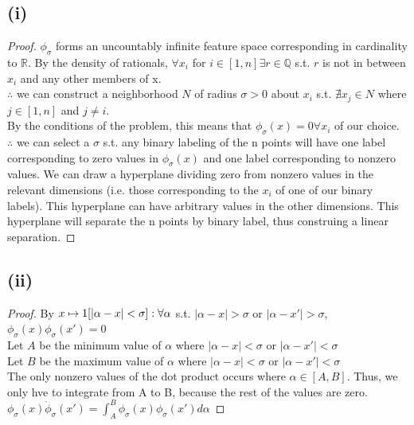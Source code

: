 \documentclass[twoside,11pt]{homework}
\begin{document}
 \subsection*{(i)}
 	\begin{proof}
 		$\phi_\sigma$ forms an uncountably infinite feature space corresponding in cardinality to $\mathbb{R}$.
 		By the density of rationals, $\forall x_i$ for $i \in [1,n] \exists r \in \mathbb{Q}$
 		s.t. $r$ is not in between $x_i$ and any other members of x. \\
 		$\therefore$ we can construct a neighborhood $N$ of radius $\sigma > 0$ about $x_i$
 		s.t. $\nexists x_j \in N$ where $j \in [1, n]$ and $j \neq i$. \\
 		By the conditions of the problem, this means that $\phi_\sigma (x) = 0 \forall x_i$ of our choice. \\
 		$\therefore$ we can select a $\sigma$ s.t. any binary labeling of the n points will have one label corresponding to zero values in $\phi_\sigma(x)$ and one label corresponding to nonzero values. We can draw a hyperplane dividing zero from nonzero values in the relevant dimensions (i.e. those corresponding to the $x_i$ of one of our binary labels). This hyperplane can have arbitrary values in the other dimensions. This hyperplane will separate the n points by binary label, thus construing a linear separation.
 	\end{proof}

 \subsection*{(ii)}
 	\begin{proof}
 		By $x \mapsto 1[|\alpha-x| < \sigma]:\\
 		\forall \alpha$ s.t. $|\alpha - x| > \sigma $ or $|\alpha - x'| > \sigma$, $\phi_\sigma(x) \phi_\sigma(x') = 0$\\
 		Let $A$ be the minimum value of $\alpha$ where $|\alpha - x| < \sigma $ or $|\alpha - x'| < \sigma$\\
 		Let $B$ be the maximum value of $\alpha$ where $|\alpha - x| < \sigma $ or $|\alpha - x'| < \sigma$\\
 		The only nonzero values of the dot product occurs where $\alpha \in [A, B]$.  Thus, we only hve to integrate from A to B, because the rest of the values are zero.\\
 		$\phi_\sigma(x) \dot \phi_\sigma(x') = \int_{A}^{B} \phi_\sigma(x) \phi_\sigma(x') d\alpha$
 	\end{proof}
\end{document}
